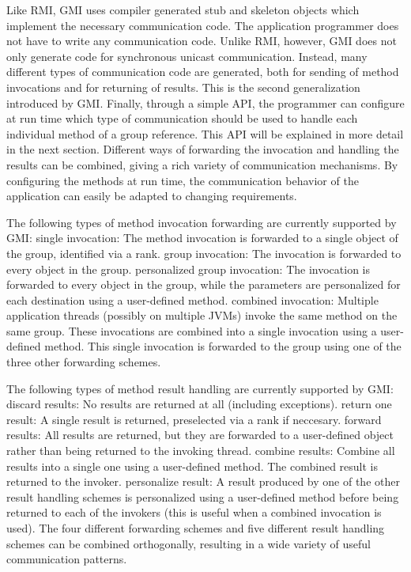 \documentclass[10pt]{article}
\begin{document}
Like RMI, GMI uses compiler generated stub and skeleton objects which
implement the necessary communication code. The application programmer
does not have to write any communication code. Unlike RMI, however,
GMI does not only generate code for synchronous unicast
communication. Instead, many different types of communication code are
generated, both for sending of method invocations and for returning of
results. This is the second generalization introduced by GMI.
Finally, through a simple API, the programmer can configure at run
time which type of communication should be used to handle each
individual method of a group reference. This API will be explained in
more detail in the next section. Different ways of forwarding the
invocation and handling the results can be combined, giving a rich
variety of communication mechanisms. By configuring the methods at run
time, the communication behavior of the application can easily be
adapted to changing requirements.

The following types of method invocation forwarding are currently
supported by GMI: single invocation: The method invocation is
forwarded to a single object of the group, identified via a rank.
group invocation: The invocation is forwarded to every object in the
group.  personalized group invocation: The invocation is forwarded to
every object in the group, while the parameters are personalized for
each destination using a user-defined method.  combined invocation:
Multiple application threads (possibly on multiple JVMs) invoke the
same method on the same group. These invocations are combined into a
single invocation using a user-defined method. This single invocation
is forwarded to the group using one of the three other forwarding
schemes.

The following types of method result handling are currently supported
by GMI: discard results: No results are returned at all (including
exceptions).  return one result: A single result is returned,
preselected via a rank if neccesary.  forward results: All results are
returned, but they are forwarded to a user-defined object rather than
being returned to the invoking thread.  combine results: Combine all
results into a single one using a user-defined method. The combined
result is returned to the invoker.  personalize result: A result
produced by one of the other result handling schemes is personalized
using a user-defined method before being returned to each of the
invokers (this is useful when a combined invocation is used).  The
four different forwarding schemes and five different result handling
schemes can be combined orthogonally, resulting in a wide variety of
useful communication patterns.  
\end{document}
